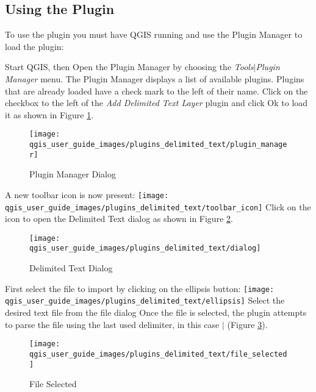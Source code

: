 \subsection{Using the Plugin}
To use the plugin you must have QGIS running and use the Plugin Manager to load the plugin:

Start QGIS, then Open the Plugin Manager by choosing the {\em Tools\mbox{$|$}Plugin Manager} menu. The Plugin Manager displays a list of available plugins. Plugins that are already loaded have a check mark to the left of their name. Click on the checkbox to the left of the {\em Add Delimited Text Layer} plugin and click Ok to load it as shown in Figure \ref{fig:plugin_manager}.

\begin{figure}[h]
   \begin{center}
   \caption{Plugin Manager Dialog}
   \label{fig:plugin_manager}
   \smallskip
   \texttt{[image: qgis\_user\_guide\_images/plugins\_delimited\_text/plugin\_manager]}
   \end{center}  
\end{figure}


A new toolbar icon is now present:
\texttt{[image: qgis\_user\_guide\_images/plugins\_delimited\_text/toolbar\_icon]}
Click on the icon to open the Delimited Text dialog as shown in Figure \ref{fig:delim_text_plugin_dialog}.

\begin{figure}[h]
   \begin{center}
   \caption{Delimited Text Dialog}\label{fig:delim_text_plugin_dialog}\smallskip
   \texttt{[image: qgis\_user\_guide\_images/plugins\_delimited\_text/dialog]}            
   \end{center}  
\end{figure}

  
First select the file to import by clicking on the ellipsis button: 
\texttt{[image: qgis\_user\_guide\_images/plugins\_delimited\_text/ellipsis]}
Select the desired text file from the file dialog
Once the file is selected, the plugin attempts to parse the file using the last
used delimiter, in this case \mbox{$|$} (Figure
\ref{fig:delim_text_file_selected}).
\begin{figure}[h]
   \begin{center}
   \caption{File Selected}\label{fig:delim_text_file_selected}\smallskip
   \texttt{[image: qgis\_user\_guide\_images/plugins\_delimited\_text/file\_selected]}   
   \end{center}  
\end{figure}

